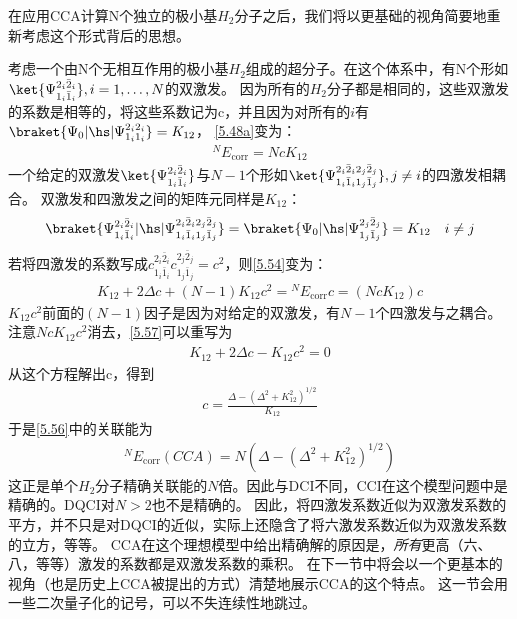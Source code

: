 在应用CCA计算N个独立的极小基$H_2$分子之后，我们将以更基础的视角简要地重新考虑这个形式背后的思想。

考虑一个由N个无相互作用的极小基$H_2$组成的超分子。在这个体系中，有N个形如$\ket{\Psi_{1_i\bar{1}_i}^{2_i\bar{2}_i}}, i=1, \ldots, N$的双激发。
因为所有的$H_2$分子都是相同的，这些双激发的系数是相等的，将这些系数记为c，并且因为对所有的$i$有$\braket{\Psi_0|\hs|\Psi_{1_i1_i}^{2_i2_i}}=K_{12}$，
\autoref{5.48a}变为：
\begin{align}
    \label{5.56}
    {}^N E_{\text{corr}}=NcK_{12}
\end{align}
一个给定的双激发$\ket{\Psi_{1_i\bar{1}_i}^{2_i\bar{2}_i}}$与$N-1$个形如$\ket{\Psi_{1_i\bar{1}_i1_j\bar{1}_j}^{2_i\bar{2}_i2_j\bar{2}_j}}, j\neq i$的四激发相耦合。
双激发和四激发之间的矩阵元同样是$K_{12}$：
\begin{align}
    \braket{\Psi_{1_i\bar{1}_i}^{2_i\bar{2}_i}|\hs|\Psi_{1_i\bar{1}_i1_j\bar{1}_j}^{2_i\bar{2}_i2_j\bar{2}_j}}=\braket{\Psi_0|\hs|\Psi_{1_j\bar{1}_j}^{2_j\bar{2}_j}}=K_{12} \quad i\neq j
\end{align}
若将四激发的系数写成$c_{1_i\bar{1}_i}^{2_i\bar{2}_i}c_{1_j\bar{1}_j}^{2_j\bar{2}_j}=c^2$，则\autoref{5.54}变为：
\begin{align}
    K_{12}+2\Delta c+(N-1)K_{12}c^2={}^N E_{\text{corr}}c=(NcK_{12})c
\end{align}
$K_{12}c^2$前面的$(N-1)$因子是因为对给定的双激发，有$N-1$个四激发与之耦合。注意$NcK_{12}c^2$消去，\autoref{5.57}可以重写为
\begin{align}
    K_{12}+2\Delta c-K_{12}c^2=0
\end{align}
从这个方程解出c，得到
\begin{align}
    c=\frac{\Delta-(\Delta^2+K^2_{12})^{1/2}}{K_{12}}
\end{align}
于是\autoref{5.56}中的关联能为
\begin{align}
    {}^NE_{\text{corr}}(CCA)=N(\Delta-(\Delta^2+K^2_{12})^{1/2})
\end{align}
这正是单个$H_2$分子精确关联能的$N$倍。因此与DCI不同，CCI在这个模型问题中是精确的。DQCI对$N>2$也不是精确的。
因此，将四激发系数近似为双激发系数的平方，并不只是对DQCI的近似，实际上还隐含了将六激发系数近似为双激发系数的立方，等等。
CCA在这个理想模型中给出精确解的原因是，\emph{所有}更高（六、八，等等）激发的系数都是双激发系数的乘积。
在下一节中将会以一个更基本的视角（也是历史上CCA被提出的方式）清楚地展示CCA的这个特点。
这一节会用一些二次量子化的记号，可以不失连续性地跳过。

